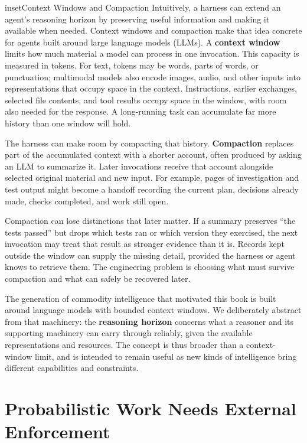 \begin{bookbox}{inset}{Context Windows and Compaction}
\label{inset-context-windows-and-compaction}
Intuitively, a harness can extend an agent's reasoning horizon by preserving useful information and making it available when needed. Context windows and compaction make that idea concrete for agents built around large language models (LLMs). A \textbf{context window} limits how much material a model can process in one invocation. This capacity is measured in tokens. For text, tokens may be words, parts of words, or punctuation; multimodal models also encode images, audio, and other inputs into representations that occupy space in the context. Instructions, earlier exchanges, selected file contents, and tool results occupy space in the window, with room also needed for the response. A long-running task can accumulate far more history than one window will hold.

The harness can make room by compacting that history. \textbf{Compaction} replaces part of the accumulated context with a shorter account, often produced by asking an LLM to summarize it. Later invocations receive that account alongside selected original material and new input. For example, pages of investigation and test output might become a handoff recording the current plan, decisions already made, checks completed, and work still open.

Compaction can lose distinctions that later matter. If a summary preserves ``the tests passed'' but drops which tests ran or which version they exercised, the next invocation may treat that result as stronger evidence than it is. Records kept outside the window can supply the missing detail, provided the harness or agent knows to retrieve them. The engineering problem is choosing what must survive compaction and what can safely be recovered later\citep{rajasekaran2025contextengineering}.

The generation of commodity intelligence that motivated this book is built around language models with bounded context windows. We deliberately abstract from that machinery: the \textbf{reasoning horizon} concerns what a reasoner and its supporting machinery can carry through reliably, given the available representations and resources. The concept is thus broader than a context-window limit, and is intended to remain useful as new kinds of intelligence bring different capabilities and constraints.
\end{bookbox}

\section{Probabilistic Work Needs External Enforcement}\label{heading:probabilistic-work-needs-external-enforcement}

